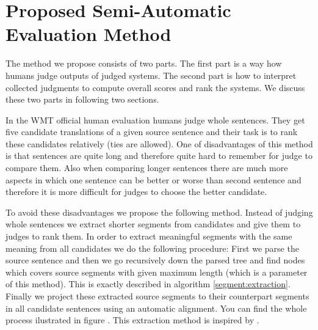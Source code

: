\chapter{Proposed Semi-Automatic Evaluation Method}


The method we propose consists of two parts. The first part is a way how humans
judge outputs of judged systems. The second part is how to interpret collected
judgments to compute overall scores and rank the systems. We discuss these two
parts in following two sections. 

In the WMT official human evaluation humans judge whole sentences. They get
five candidate translations of a given source sentence and their task is to
rank these candidates relatively (ties are allowed). One of disadvantages of
this method is that sentences are quite long and therefore quite hard to
remember for judge to compare them. Also when comparing longer sentences there
are much more aspects in which one sentence can be better or worse than second
sentence and therefore it is more difficult for judges to choose the better
candidate. 


To avoid these disadvantages we propose the following method. Instead of
judging whole sentences we extract shorter segments from candidates and give
them to judges to rank them. In order to extract meaningful segments with the
same meaning from all candidates we do the following procedure: First we parse
the source sentence and then we go recursively down the parsed tree and find
nodes which covers source segments with given maximum length (which is a
parameter of this method). This is exactly described in algorithm
\ref{segment:extraction}. Finally we project these extracted source segments to
their counterpart segments in all candidate sentences using an automatic
alignment.  You can find the whole process ilustrated in figure .  This extraction method is inspired by .

